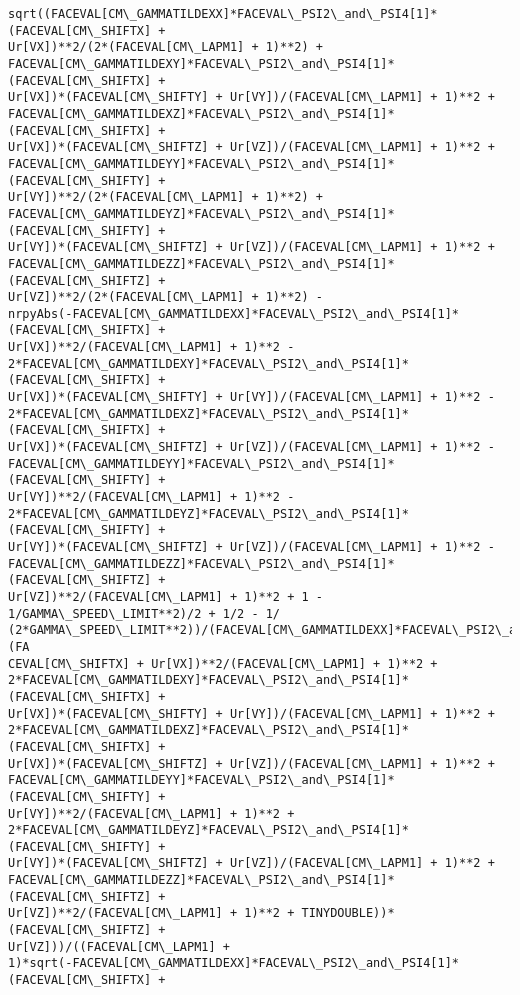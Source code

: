 \documentclass[landscape,letterpaper,10pt,english]{article}
\begin{document}
\begin{Verbatim}[commandchars=\\\{\}]
sqrt((FACEVAL[CM\_GAMMATILDEXX]*FACEVAL\_PSI2\_and\_PSI4[1]*(FACEVAL[CM\_SHIFTX] +
Ur[VX])**2/(2*(FACEVAL[CM\_LAPM1] + 1)**2) +
FACEVAL[CM\_GAMMATILDEXY]*FACEVAL\_PSI2\_and\_PSI4[1]*(FACEVAL[CM\_SHIFTX] +
Ur[VX])*(FACEVAL[CM\_SHIFTY] + Ur[VY])/(FACEVAL[CM\_LAPM1] + 1)**2 +
FACEVAL[CM\_GAMMATILDEXZ]*FACEVAL\_PSI2\_and\_PSI4[1]*(FACEVAL[CM\_SHIFTX] +
Ur[VX])*(FACEVAL[CM\_SHIFTZ] + Ur[VZ])/(FACEVAL[CM\_LAPM1] + 1)**2 +
FACEVAL[CM\_GAMMATILDEYY]*FACEVAL\_PSI2\_and\_PSI4[1]*(FACEVAL[CM\_SHIFTY] +
Ur[VY])**2/(2*(FACEVAL[CM\_LAPM1] + 1)**2) +
FACEVAL[CM\_GAMMATILDEYZ]*FACEVAL\_PSI2\_and\_PSI4[1]*(FACEVAL[CM\_SHIFTY] +
Ur[VY])*(FACEVAL[CM\_SHIFTZ] + Ur[VZ])/(FACEVAL[CM\_LAPM1] + 1)**2 +
FACEVAL[CM\_GAMMATILDEZZ]*FACEVAL\_PSI2\_and\_PSI4[1]*(FACEVAL[CM\_SHIFTZ] +
Ur[VZ])**2/(2*(FACEVAL[CM\_LAPM1] + 1)**2) -
nrpyAbs(-FACEVAL[CM\_GAMMATILDEXX]*FACEVAL\_PSI2\_and\_PSI4[1]*(FACEVAL[CM\_SHIFTX] +
Ur[VX])**2/(FACEVAL[CM\_LAPM1] + 1)**2 -
2*FACEVAL[CM\_GAMMATILDEXY]*FACEVAL\_PSI2\_and\_PSI4[1]*(FACEVAL[CM\_SHIFTX] +
Ur[VX])*(FACEVAL[CM\_SHIFTY] + Ur[VY])/(FACEVAL[CM\_LAPM1] + 1)**2 -
2*FACEVAL[CM\_GAMMATILDEXZ]*FACEVAL\_PSI2\_and\_PSI4[1]*(FACEVAL[CM\_SHIFTX] +
Ur[VX])*(FACEVAL[CM\_SHIFTZ] + Ur[VZ])/(FACEVAL[CM\_LAPM1] + 1)**2 -
FACEVAL[CM\_GAMMATILDEYY]*FACEVAL\_PSI2\_and\_PSI4[1]*(FACEVAL[CM\_SHIFTY] +
Ur[VY])**2/(FACEVAL[CM\_LAPM1] + 1)**2 -
2*FACEVAL[CM\_GAMMATILDEYZ]*FACEVAL\_PSI2\_and\_PSI4[1]*(FACEVAL[CM\_SHIFTY] +
Ur[VY])*(FACEVAL[CM\_SHIFTZ] + Ur[VZ])/(FACEVAL[CM\_LAPM1] + 1)**2 -
FACEVAL[CM\_GAMMATILDEZZ]*FACEVAL\_PSI2\_and\_PSI4[1]*(FACEVAL[CM\_SHIFTZ] +
Ur[VZ])**2/(FACEVAL[CM\_LAPM1] + 1)**2 + 1 - 1/GAMMA\_SPEED\_LIMIT**2)/2 + 1/2 - 1/
(2*GAMMA\_SPEED\_LIMIT**2))/(FACEVAL[CM\_GAMMATILDEXX]*FACEVAL\_PSI2\_and\_PSI4[1]*(FA
CEVAL[CM\_SHIFTX] + Ur[VX])**2/(FACEVAL[CM\_LAPM1] + 1)**2 +
2*FACEVAL[CM\_GAMMATILDEXY]*FACEVAL\_PSI2\_and\_PSI4[1]*(FACEVAL[CM\_SHIFTX] +
Ur[VX])*(FACEVAL[CM\_SHIFTY] + Ur[VY])/(FACEVAL[CM\_LAPM1] + 1)**2 +
2*FACEVAL[CM\_GAMMATILDEXZ]*FACEVAL\_PSI2\_and\_PSI4[1]*(FACEVAL[CM\_SHIFTX] +
Ur[VX])*(FACEVAL[CM\_SHIFTZ] + Ur[VZ])/(FACEVAL[CM\_LAPM1] + 1)**2 +
FACEVAL[CM\_GAMMATILDEYY]*FACEVAL\_PSI2\_and\_PSI4[1]*(FACEVAL[CM\_SHIFTY] +
Ur[VY])**2/(FACEVAL[CM\_LAPM1] + 1)**2 +
2*FACEVAL[CM\_GAMMATILDEYZ]*FACEVAL\_PSI2\_and\_PSI4[1]*(FACEVAL[CM\_SHIFTY] +
Ur[VY])*(FACEVAL[CM\_SHIFTZ] + Ur[VZ])/(FACEVAL[CM\_LAPM1] + 1)**2 +
FACEVAL[CM\_GAMMATILDEZZ]*FACEVAL\_PSI2\_and\_PSI4[1]*(FACEVAL[CM\_SHIFTZ] +
Ur[VZ])**2/(FACEVAL[CM\_LAPM1] + 1)**2 + TINYDOUBLE))*(FACEVAL[CM\_SHIFTZ] +
Ur[VZ]))/((FACEVAL[CM\_LAPM1] +
1)*sqrt(-FACEVAL[CM\_GAMMATILDEXX]*FACEVAL\_PSI2\_and\_PSI4[1]*(FACEVAL[CM\_SHIFTX] +

\end{Verbatim}
\end{document}
